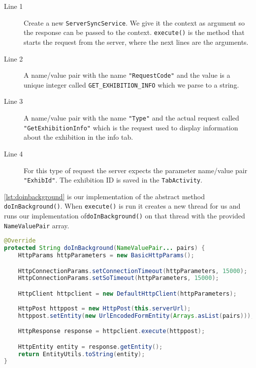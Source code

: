 \begin{description}
\item[Line 1] Create a new \lstinline|ServerSyncService|. We give it the context as argument so the response can be passed to the context. \lstinline|execute()| is the method that starts the request from the server, where the next lines are the arguments.
\item[Line 2] A name/value pair with the name \lstinline|"RequestCode"| and the value is a unique integer called \lstinline|GET_EXHIBITION_INFO| which we parse to a string.
\item[Line 3] A name/value pair with the name \lstinline|"Type"| and the actual request called \lstinline|"GetExhibitionInfo"| which is the request used to display information about the exhibition in the info tab.
\item[Line 4] For this type of request the server expects the parameter name/value pair \lstinline|"ExhibId"|. The exhibition ID is saved in the \lstinline|TabActivity|.
\end{description}
\autoref{lst:doinbackground} is our implementation of the abstract method \lstinline|doInBackground()|. When \lstinline|execute()| is run it creates a new thread for us and runs our implementation of\linebreak \lstinline|doInBackground()| on that thread with the provided \lstinline|NameValuePair| array.

\begin{lstlisting}[language=java, label=lst:doinbackground, caption={The async abstract method \lstinline|doInBackground()|}]
@Override
protected String doInBackground(NameValuePair... pairs) {
    HttpParams httpParameters = new BasicHttpParams();

    HttpConnectionParams.setConnectionTimeout(httpParameters, 15000);
    HttpConnectionParams.setSoTimeout(httpParameters, 15000);

    HttpClient httpclient = new DefaultHttpClient(httpParameters);
    
    HttpPost httppost = new HttpPost(this.serverUrl);
    httppost.setEntity(new UrlEncodedFormEntity(Arrays.asList(pairs)));

    HttpResponse response = httpclient.execute(httppost);

    HttpEntity entity = response.getEntity();
    return EntityUtils.toString(entity);
}
\end{lstlisting}

